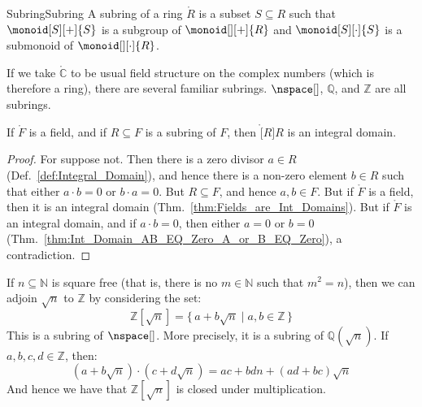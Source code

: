 \documentclass{article}                                                        %
\begin{document}
        \begin{fdefinition}{Subring}{Subring}
            A subring of a ring $\ring{R}$ is a subset $S\subseteq{R}$ such that
            $\monoid[S][+]{S}$ is a subgroup of $\monoid[][+]{R}$ and
            $\monoid[S][\cdot]{S}$ is a submonoid of $\monoid[][\cdot]{R}$.
        \end{fdefinition}
        \begin{example}
            If we take $\ring{\mathbb{C}}$ to be usual field structure on the
            complex numbers (which is therefore a ring), there are several
            familiar subrings. $\nspace[]$, $\mathbb{Q}$, and $\mathbb{Z}$ are
            all subrings.
        \end{example}
        \begin{theorem}
            \label{thm:Subring_of_Field_is_Int_Domain}%
            If $\ring{F}$ is a field, and if $R\subseteq{F}$ is a subring of
            $F$, then $\ring[R]{R}$ is an integral domain.
        \end{theorem}
        \begin{proof}
            For suppose not. Then there is a zero divisor $a\in{R}$
            (Def.~\ref{def:Integral_Domain}), and hence there is a non-zero
            element $b\in{R}$ such that either $a\cdot{b}=0$ or $b\cdot{a}=0$.
            But $R\subseteq{F}$, and hence $a,b\in{F}$. But if $\ring{F}$ is a
            field, then it is an integral domain
            (Thm.~\ref{thm:Fields_are_Int_Domains}). But if $\ring{F}$ is an
            integral domain, and if $a\cdot{b}=0$, then either $a=0$ or $b=0$
            (Thm.~\ref{thm:Int_Domain_AB_EQ_Zero_A_or_B_EQ_Zero}),
            a contradiction.
        \end{proof}
        \begin{example}
            If $n\subseteq\mathbb{N}$ is square free (that is, there is no
            $m\in\mathbb{N}$ such that $m^{2}=n$), then we can adjoin
            $\sqrt{n}$ to $\mathbb{Z}$ by considering the set:
            \begin{equation}
                \mathbb{Z}[\sqrt{n}]=\{\,a+b\sqrt{n}\;|\;a,b\in\mathbb{Z}\,\}
            \end{equation}
            This is a subring of $\nspace[]$. More precisely, it is a subring of
            $\mathbb{Q}(\sqrt{n})$. If $a,b,c,d\in\mathbb{Z}$, then:
            \begin{equation}
                (a+b\sqrt{n})\cdot(c+d\sqrt{n})=ac+bdn+(ad+bc)\sqrt{n}
            \end{equation}
            And hence we have that $\mathbb{Z}[\sqrt{n}]$ is closed under
            multiplication.
        \end{example}
\end{document}
